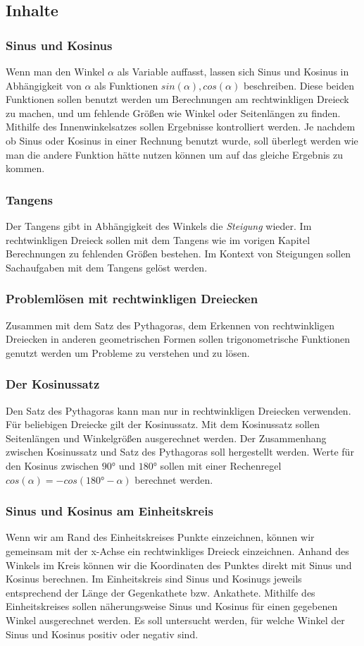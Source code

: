 \documentclass{article}
\begin{document}
\subsection{Inhalte}
\subsubsection*{Sinus und Kosinus}
Wenn man den Winkel $\alpha$ als Variable auffasst, lassen sich Sinus und Kosinus in Abhängigkeit von $\alpha$ als Funktionen $sin(\alpha), cos(\alpha)$ beschreiben.
Diese beiden Funktionen sollen benutzt werden um Berechnungen am rechtwinkligen Dreieck zu machen, und um fehlende Größen wie Winkel oder Seitenlängen zu finden.
Mithilfe des Innenwinkelsatzes sollen Ergebnisse kontrolliert werden.
Je nachdem ob Sinus oder Kosinus in einer Rechnung benutzt wurde, soll überlegt werden wie man die andere Funktion hätte nutzen können um auf das gleiche Ergebnis zu kommen.
\subsubsection*{Tangens}
Der Tangens gibt in Abhängigkeit des Winkels die \textit{Steigung} wieder.
Im rechtwinkligen Dreieck sollen mit dem Tangens wie im vorigen Kapitel Berechnungen zu fehlenden Größen bestehen.
Im Kontext von Steigungen sollen Sachaufgaben mit dem Tangens gelöst werden.
\subsubsection*{Problemlösen mit rechtwinkligen Dreiecken}
Zusammen mit dem Satz des Pythagoras, dem Erkennen von rechtwinkligen Dreiecken in anderen geometrischen Formen sollen  trigonometrische Funktionen genutzt werden um Probleme zu verstehen und zu lösen. 
\subsubsection*{Der Kosinussatz}
Den Satz des Pythagoras kann man nur in rechtwinkligen Dreiecken verwenden. Für beliebigen Dreiecke gilt der Kosinussatz.
Mit dem Kosinussatz sollen Seitenlängen und Winkelgrößen ausgerechnet werden.
Der Zusammenhang zwischen Kosinussatz und Satz des Pythagoras soll hergestellt werden.
Werte für den Kosinus zwischen $90°$ und $180°$ sollen mit einer Rechenregel $cos(\alpha) = - cos(180° - \alpha)$ berechnet werden.
\subsubsection*{Sinus und Kosinus am Einheitskreis}
Wenn wir am Rand des Einheitskreises Punkte einzeichnen, können wir gemeinsam mit der x-Achse ein rechtwinkliges Dreieck einzeichnen.
Anhand des Winkels im Kreis können wir die Koordinaten des Punktes direkt mit Sinus und Kosinus berechnen. 
Im Einheitskreis sind Sinus und Kosinugs jeweils entsprechend der Länge der Gegenkathete bzw. Ankathete.
Mithilfe des Einheitskreises sollen näherungsweise Sinus und Kosinus für einen gegebenen Winkel ausgerechnet werden.
Es soll untersucht werden, für welche Winkel der Sinus und Kosinus positiv oder negativ sind.
\end{document}
